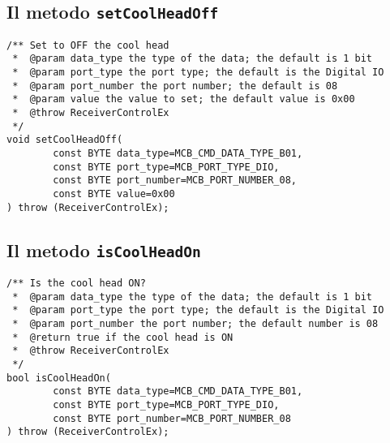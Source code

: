 \subsection{Il metodo \texttt{setCoolHeadOff}}
\lstset{language=C++}
\begin{lstlisting}[caption={Dichiarazione del metodo \texttt{setCoolHeadOff}},
label=lst:setCoolHeadOff,mathescape]
/** Set to OFF the cool head 
 *  @param data_type the type of the data; the default is 1 bit
 *  @param port_type the port type; the default is the Digital IO
 *  @param port_number the port number; the default is 08
 *  @param value the value to set; the default value is 0x00
 *  @throw ReceiverControlEx
 */
void setCoolHeadOff(
        const BYTE data_type=MCB_CMD_DATA_TYPE_B01,
        const BYTE port_type=MCB_PORT_TYPE_DIO,   
        const BYTE port_number=MCB_PORT_NUMBER_08,
        const BYTE value=0x00
) throw (ReceiverControlEx);
\end{lstlisting}
\lstset{numbers=none}


\subsection{Il metodo \texttt{isCoolHeadOn}}
\lstset{language=C++}
\begin{lstlisting}[caption={Dichiarazione del metodo \texttt{isCoolHeadOn}},
label=lst:isCoolHeadOn,mathescape]
/** Is the cool head ON?
 *  @param data_type the type of the data; the default is 1 bit
 *  @param port_type the port type; the default is the Digital IO
 *  @param port_number the port number; the default number is 08
 *  @return true if the cool head is ON
 *  @throw ReceiverControlEx
 */
bool isCoolHeadOn(
        const BYTE data_type=MCB_CMD_DATA_TYPE_B01,
        const BYTE port_type=MCB_PORT_TYPE_DIO,   
        const BYTE port_number=MCB_PORT_NUMBER_08
) throw (ReceiverControlEx);
\end{lstlisting}
\lstset{numbers=none}


